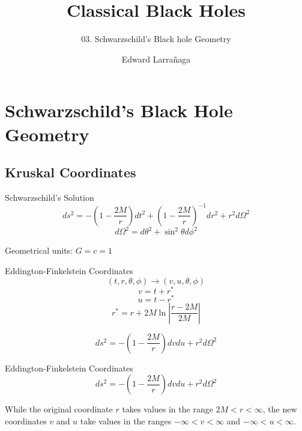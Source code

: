 \documentclass{beamer}
\title{Classical Black Holes} %
\subtitle{03. Schwarzschild's Black hole Geometry} %
\author{Edward Larra\~{n}aga}
\begin{document}
  \frame{\maketitle}

    \section{Schwarzschild's Black Hole Geometry}
    
    \subsection{Kruskal Coordinates}
    	\begin{frame}{Schwarzschild's Solution}
    		$$ ds^2 = - \left( 1 - \frac{2M}{r} \right) dt^2 
            + \left( 1 - \frac{2M}{r} \right)^{-1} dr^2 
            + r^2 d\Omega^{2} $$
            \pause
            $$ d\Omega^{2} = d\theta^2 + \sin^2 \theta d\phi^2 $$
            \bigskip
            
            Geometrical units: $ G = c = 1$ 
    	\end{frame}
        
        \begin{frame}{Eddington-Finkelstein Coordinates}
        	$$ (t, r, \theta, \phi) \longrightarrow (v, u, \theta, \phi) $$
            \pause
            $$ v = t + r^* $$
            $$ u = t - r^* $$
            \pause
        	$$ r^{*} = r + 2M \ln\left| \frac{r-2M}{2M}\right| $$
            \pause
            \bigskip
            
            $$ ds^2=-\left(1-\frac{2M}{r}\right)dvdu + r^2 d\Omega^{2} $$
    	\end{frame}
        
        \begin{frame}{Eddington-Finkelstein Coordinates}
            $$ ds^2=-\left(1-\frac{2M}{r}\right)dvdu + r^2 d\Omega^{2} $$
            \pause
            \bigskip
            
			While the original coordinate $r$ takes values in the range $2M < r < \infty$,
the new coordinates $v$ and $u$ take values in the ranges $ -\infty < v < \infty$ and $ -\infty < u < \infty$.
        \end{frame}
        
\end{document}
